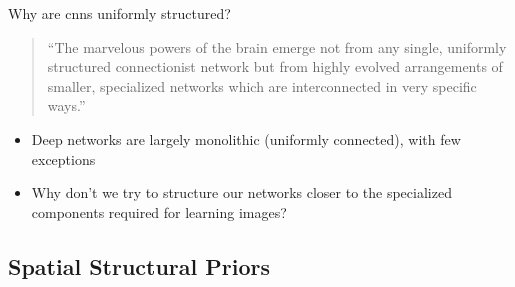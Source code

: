 \documentclass[t,xcolor=dvipsnames]{beamer}
\begin{document}
\begin{frame}{Why are \glspl{cnn} uniformly structured?}
\begin{quote}
``The marvelous powers of the brain emerge not from any single, uniformly structured
connectionist network but from highly evolved arrangements of smaller, specialized
networks which are interconnected in very specific ways.''\\
\end{quote}
\begin{itemize}
    \item Deep networks are largely monolithic (uniformly connected), with few exceptions
    \item Why don't we try to structure our networks closer to the specialized components required for learning images?
\end{itemize}
\end{frame}

\subsection{Spatial Structural Priors}

\end{document}
